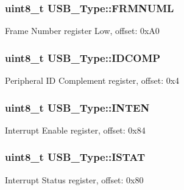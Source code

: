 \subsubsection[{\texorpdfstring{F\+R\+M\+N\+U\+ML}{FRMNUML}}]{ uint8\+\_\+t U\+S\+B\+\_\+\+Type\+::\+F\+R\+M\+N\+U\+ML}\hypertarget{structUSB__Type_af0454bfe2e97064f2b6bd616350ec802}{}\label{structUSB__Type_af0454bfe2e97064f2b6bd616350ec802}
Frame Number register Low, offset\+: 0x\+A0 
\subsubsection[{\texorpdfstring{I\+D\+C\+O\+MP}{IDCOMP}}]{ uint8\+\_\+t U\+S\+B\+\_\+\+Type\+::\+I\+D\+C\+O\+MP}\hypertarget{structUSB__Type_afff047b66a448cfa17baf6acf33fd58a}{}\label{structUSB__Type_afff047b66a448cfa17baf6acf33fd58a}
Peripheral ID Complement register, offset\+: 0x4 
\subsubsection[{\texorpdfstring{I\+N\+T\+EN}{INTEN}}]{ uint8\+\_\+t U\+S\+B\+\_\+\+Type\+::\+I\+N\+T\+EN}\hypertarget{structUSB__Type_afbe12dd614f13edb2741464672b0d411}{}\label{structUSB__Type_afbe12dd614f13edb2741464672b0d411}
Interrupt Enable register, offset\+: 0x84 
\subsubsection[{\texorpdfstring{I\+S\+T\+AT}{ISTAT}}]{ uint8\+\_\+t U\+S\+B\+\_\+\+Type\+::\+I\+S\+T\+AT}\hypertarget{structUSB__Type_aaea8dad14f2d470b66a880384aef09d8}{}\label{structUSB__Type_aaea8dad14f2d470b66a880384aef09d8}
Interrupt Status register, offset\+: 0x80 
